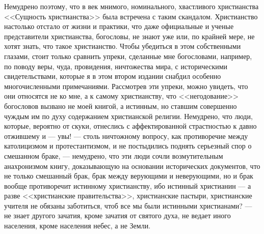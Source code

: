 \documentclass[12pt,oneside]{book}
\begin{document}
Немудрено поэтому, что в век мнимого, номинального, хвастливого христианства <<Сущность христианства>> была встречена с таким скандалом. Христианство настолько отстало от жизни и практики, что даже официальные и ученые представители христианства, богословы, не знают уже или, по крайней мере, не хотят знать, что такое христианство. Чтобы убедиться в этом собственными глазами, стоит только сравнить упреки, сделанные мне богословами, например, по поводу веры, чуда, провидения, ничтожества мира, с историческими свидетельствами, которые я в этом втором издании снабдил особенно многочисленными примечаниями. Рассмотрев эти упреки, можно увидеть, что они относятся не ко мне, а к самому христианству, что <<негодование>> богословов вызвано не моей книгой, а истинным, но ставшим совершенно чуждым им по духу содержанием христианской религии. Немудрено, что люди, которые, вероятно от скуки, отнеслись с аффектированной страстностью к давно отжившему и --- увы! --- столь ничтожному вопросу, как противоречие между католицизмом и протестантизмом, и не постыдились поднять серьезный спор о смешанном браке, --- немудрено, что эти люди сочли возмутительным анахронизмом книгу, доказывающую на основании исторических документов, что не только смешанный брак, брак между верующими и неверующими, но и брак вообще противоречит истинному христианству, ибо истинный христианин --– а разве <<христианские правительства>>, христианские пастыри, христианские учителя не обязаны заботиться, чтоб все мы были истинными христианами? --- не знает другого зачатия, кроме зачатия от святого духа, не ведает иного населения, кроме населения небес, а не Земли.
\end{document}
